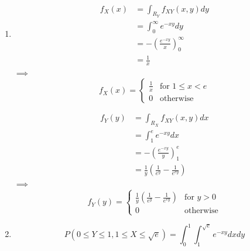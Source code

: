 \begin{problem}{17} $ $
\begin{enumerate}

\item 

\begin{align*}
f_X(x) &= \int_{R_Y} f_{XY}(x, y)dy \\
&= \int_{0}^\infty e^{-xy}dy \\
&= -\left( \frac{e^{-xy}}{x}\right)_0^\infty \\
& = \frac{1}{x}
\end{align*}
$\implies$
\[
  f_X(x) =
  \begin{cases}
                                   \frac{1}{x}& \text{for $1 \le x< e$} \\
                                   0& \text{otherwise}
   \end{cases}
\]

\begin{align*}
f_Y(y) &= \int_{R_X} f_{XY}(x, y)dx \\
&= \int_{1}^e e^{-xy}dx \\
&= -\left( \frac{e^{-xy}}{y}\right)_1^e \\
& = \frac{1}{y} \left(\frac{1}{e^y}-\frac{1}{e^{ey}} \right)
\end{align*}
$\implies$
\[
  f_Y(y) =
  \begin{cases}
                                    \frac{1}{y} \left(\frac{1}{e^y}-\frac{1}{e^{ey}} \right)& \text{for $y>0$} \\
                                   0& \text{otherwise}
   \end{cases}
\]

\item 

\begin{equation*}
P(0 \le Y \le 1, 1 \le X\le \sqrt{e}) = \int_0^1\int_1^{\sqrt{e}} e^{-xy} dx dy
\end{equation*}



\end{enumerate}
\end{problem}

